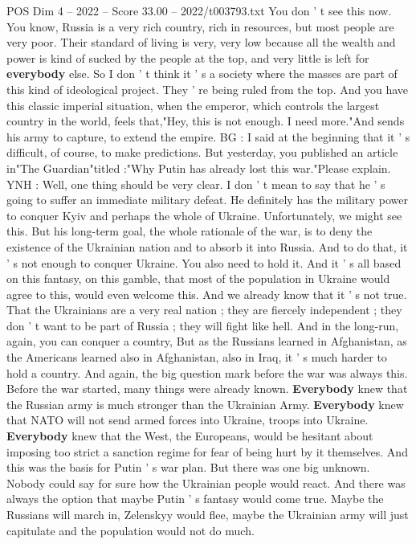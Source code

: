 \begin{textsample}{POS Dim 4 – 2022 – Score 33.00 – 2022/t003793.txt}
You don ' t see this now.
You know, Russia is a very rich country, rich in resources, but most people are very poor.
Their standard of living is very, very low because all the wealth and power is kind of sucked by the people at the top, and very little is left for \textbf{everybody} else.
So I don ' t think it ' s a society where the masses are part of this kind of ideological project.
They ' re being ruled from the top.
And you have this classic imperial situation, when the emperor, which controls the largest country in the world, feels that,"Hey, this is not enough.
I need more."And sends his army to capture, to extend the empire.
BG : I said at the beginning that it ' s difficult, of course, to make predictions.
But yesterday, you published an article in"The Guardian"titled :"Why Putin has already lost this war."Please explain.
YNH : Well, one thing should be very clear.
I don ' t mean to say that he ' s going to suffer an immediate military defeat.
He definitely has the military power to conquer Kyiv and perhaps the whole of Ukraine.
Unfortunately, we might see this.
But his long-term goal, the whole rationale of the war, is to deny the existence of the Ukrainian nation and to absorb it into Russia.
And to do that, it ' s not enough to conquer Ukraine.
You also need to hold it.
And it ' s all based on this fantasy, on this gamble, that most of the population in Ukraine would agree to this, would even welcome this.
And we already know that it ' s not true.
That the Ukrainians are a very real nation ; they are fiercely independent ; they don ' t want to be part of Russia ; they will fight like hell.
And in the long-run, again, you can conquer a country, But as the Russians learned in Afghanistan, as the Americans learned also in Afghanistan, also in Iraq, it ' s much harder to hold a country.
And again, the big question mark before the war was always this.
Before the war started, many things were already known. \textbf{Everybody} knew that the Russian army is much stronger than the Ukrainian Army. \textbf{Everybody} knew that NATO will not send armed forces into Ukraine, troops into Ukraine. \textbf{Everybody} knew that the West, the Europeans, would be hesitant about imposing too strict a sanction regime for fear of being hurt by it themselves.
And this was the basis for Putin ' s war plan.
But there was one big unknown.
Nobody could say for sure how the Ukrainian people would react.
And there was always the option that maybe Putin ' s fantasy would come true.
Maybe the Russians will march in, Zelenskyy would flee, maybe the Ukrainian army will just capitulate and the population would not do much.

\end{textsample}
